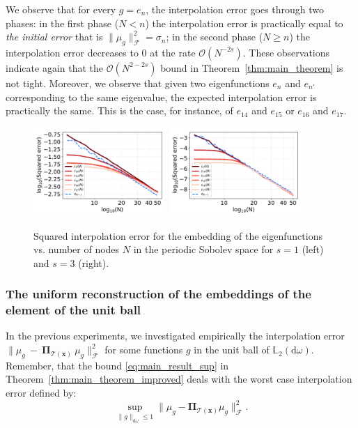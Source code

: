 \documentclass[twoside,11pt]{book}
\numberwithin{theorem}{chapter}
\numberwithin{definition}{chapter}
\numberwithin{proposition}{chapter}
\numberwithin{corollary}{chapter}
\numberwithin{example}{chapter}
\numberwithin{lemma}{chapter}
\numberwithin{assumption}{chapter}
\begin{document}
 We observe that for every $g = e_{n}$, the interpolation error goes through two phases: in the first phase ($N < n$) the interpolation error is practically equal to \emph{the initial error} that is $\|\mu_{g}\|_{\mathcal{F}}^{2} = \sigma_{n}$; in the second phase ($N \geq n$) the interpolation error decreases to $0$ at the rate $\mathcal{O}(N^{-2s})$. These observations indicate again that the $\mathcal{O}(N^{2-2s})$ bound in Theorem~\ref{thm:main_theorem} is not tight.
 Moreover, we observe that given two eigenfunctions $e_{n}$ and $e_{n'}$ corresponding to the same eigenvalue, the expected interpolation error is practically the same. This is the case, for instance, of $e_{14}$ and $e_{15}$ or $e_{16}$ and $e_{17}$.
\begin{figure}
\centering
\includegraphics[width=0.45\textwidth]{img/neurips/Sobolev/multig_interpolation_pSobolev_s_1_fig_1.pdf}
\includegraphics[width=0.45\textwidth]{img/neurips/Sobolev/multig_interpolation_pSobolev_s_3_fig_1.pdf}\\
\caption{Squared interpolation error for the embedding of the eigenfunctions vs. number of nodes $N$ in the periodic Sobolev space for $s = 1$ (left) and $s=3$ (right).
\label{fig:pDPP_results_pSobolev_exp_2}}
\end{figure}
\subsubsection{The uniform reconstruction of the embeddings of the element of the unit ball}



In the previous experiments, we investigated empirically the interpolation error $\|\mu_{g}~-~\bm{\Pi}_{\mathcal{T}(\bm{x})}~\mu_{g}\|_{\mathcal{F}}^{2}$ for some functions $g$ in the unit ball of $\mathbb{L}_{2}(\mathrm{d}\omega)$. Remember, that the bound \eqref{eq:main_result_sup} in Theorem~\ref{thm:main_theorem_improved} deals with the worst case interpolation error defined by:
\begin{equation}\label{eq:worst_interpolation_error_supunitball}
\sup\limits_{\|g\|_{\mathrm{d}\omega} \leq 1} \|\mu_{g}-\bm{\Pi}_{\mathcal{T}(\bm{x})} \mu_{g}\|_{\mathcal{F}}^{2}.
\end{equation}
\end{document}
